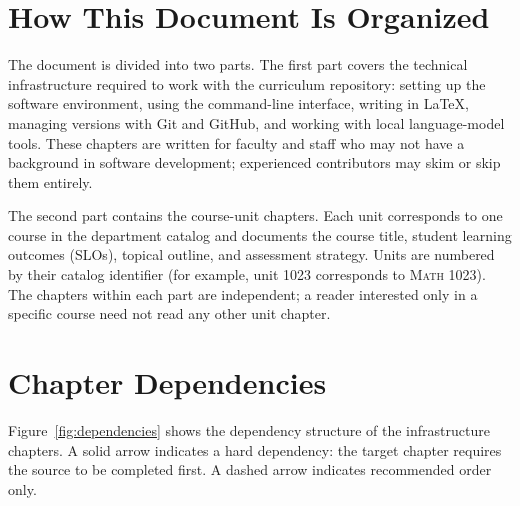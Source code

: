 \section*{How This Document Is Organized}

The document is divided into two parts. The first part covers the
technical infrastructure required to work with the curriculum
repository: setting up the software environment, using the
command-line interface, writing in \LaTeX{}, managing versions with
Git and GitHub, and working with local language-model tools. These
chapters are written for faculty and staff who may not have a
background in software development; experienced contributors may skim
or skip them entirely.

The second part contains the course-unit chapters. Each unit
corresponds to one course in the department catalog and documents the
course title, student learning outcomes (SLOs), topical outline, and
assessment strategy. Units are numbered by their catalog identifier
(for example, unit 1023 corresponds to \textsc{Math 1023}). The
chapters within each part are independent; a reader interested only
in a specific course need not read any other unit chapter.

\section*{Chapter Dependencies}

      \renewcommand{\thefigure}{\arabic{figure}}
      \setcounter{figure}{0}
      Figure~\ref{fig:dependencies} shows the dependency structure of the
      infrastructure chapters. A solid arrow indicates a hard dependency:
      the target chapter requires the source to be completed first. A
      dashed arrow indicates recommended order only.

